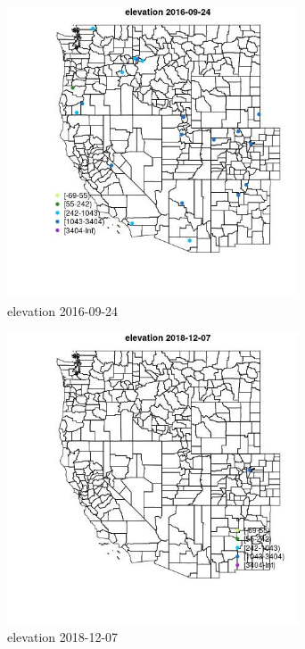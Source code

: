 \begin{figure} 
\centering  
\includegraphics[width=0.77\textwidth]{Code_Outputs/Report_ML_input_PM25_Step4_part_e_de_duplicated_aves_MapObselevation2016-09-24.jpg} 
\caption{\label{fig:Report_ML_input_PM25_Step4_part_e_de_duplicated_avesMapObselevation2016-09-24}elevation 2016-09-24} 
\end{figure} 
 

\begin{figure} 
\centering  
\includegraphics[width=0.77\textwidth]{Code_Outputs/Report_ML_input_PM25_Step4_part_e_de_duplicated_aves_MapObselevation2018-12-07.jpg} 
\caption{\label{fig:Report_ML_input_PM25_Step4_part_e_de_duplicated_avesMapObselevation2018-12-07}elevation 2018-12-07} 
\end{figure} 
 

